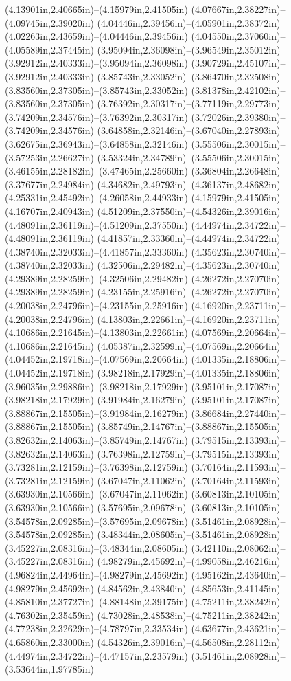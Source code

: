 (4.13901in,2.40665in)--(4.15979in,2.41505in) (4.07667in,2.38227in)--(4.09745in,2.39020in) (4.04446in,2.39456in)--(4.05901in,2.38372in) (4.02263in,2.43659in)--(4.04446in,2.39456in) (4.04550in,2.37060in)--(4.05589in,2.37445in) (3.95094in,2.36098in)--(3.96549in,2.35012in) (3.92912in,2.40333in)--(3.95094in,2.36098in) (3.90729in,2.45107in)--(3.92912in,2.40333in) (3.85743in,2.33052in)--(3.86470in,2.32508in) (3.83560in,2.37305in)--(3.85743in,2.33052in) (3.81378in,2.42102in)--(3.83560in,2.37305in) (3.76392in,2.30317in)--(3.77119in,2.29773in) (3.74209in,2.34576in)--(3.76392in,2.30317in) (3.72026in,2.39380in)--(3.74209in,2.34576in) (3.64858in,2.32146in)--(3.67040in,2.27893in) (3.62675in,2.36943in)--(3.64858in,2.32146in) (3.55506in,2.30015in)--(3.57253in,2.26627in) (3.53324in,2.34789in)--(3.55506in,2.30015in) (3.46155in,2.28182in)--(3.47465in,2.25660in) (3.36804in,2.26648in)--(3.37677in,2.24984in) (4.34682in,2.49793in)--(4.36137in,2.48682in) (4.25331in,2.45492in)--(4.26058in,2.44933in) (4.15979in,2.41505in)--(4.16707in,2.40943in) (4.51209in,2.37550in)--(4.54326in,2.39016in) (4.48091in,2.36119in)--(4.51209in,2.37550in) (4.44974in,2.34722in)--(4.48091in,2.36119in) (4.41857in,2.33360in)--(4.44974in,2.34722in) (4.38740in,2.32033in)--(4.41857in,2.33360in) (4.35623in,2.30740in)--(4.38740in,2.32033in) (4.32506in,2.29482in)--(4.35623in,2.30740in) (4.29389in,2.28259in)--(4.32506in,2.29482in) (4.26272in,2.27070in)--(4.29389in,2.28259in) (4.23155in,2.25916in)--(4.26272in,2.27070in) (4.20038in,2.24796in)--(4.23155in,2.25916in) (4.16920in,2.23711in)--(4.20038in,2.24796in) (4.13803in,2.22661in)--(4.16920in,2.23711in) (4.10686in,2.21645in)--(4.13803in,2.22661in) (4.07569in,2.20664in)--(4.10686in,2.21645in) (4.05387in,2.32599in)--(4.07569in,2.20664in) (4.04452in,2.19718in)--(4.07569in,2.20664in) (4.01335in,2.18806in)--(4.04452in,2.19718in) (3.98218in,2.17929in)--(4.01335in,2.18806in) (3.96035in,2.29886in)--(3.98218in,2.17929in) (3.95101in,2.17087in)--(3.98218in,2.17929in) (3.91984in,2.16279in)--(3.95101in,2.17087in) (3.88867in,2.15505in)--(3.91984in,2.16279in) (3.86684in,2.27440in)--(3.88867in,2.15505in) (3.85749in,2.14767in)--(3.88867in,2.15505in) (3.82632in,2.14063in)--(3.85749in,2.14767in) (3.79515in,2.13393in)--(3.82632in,2.14063in) (3.76398in,2.12759in)--(3.79515in,2.13393in) (3.73281in,2.12159in)--(3.76398in,2.12759in) (3.70164in,2.11593in)--(3.73281in,2.12159in) (3.67047in,2.11062in)--(3.70164in,2.11593in) (3.63930in,2.10566in)--(3.67047in,2.11062in) (3.60813in,2.10105in)--(3.63930in,2.10566in) (3.57695in,2.09678in)--(3.60813in,2.10105in) (3.54578in,2.09285in)--(3.57695in,2.09678in) (3.51461in,2.08928in)--(3.54578in,2.09285in) (3.48344in,2.08605in)--(3.51461in,2.08928in) (3.45227in,2.08316in)--(3.48344in,2.08605in) (3.42110in,2.08062in)--(3.45227in,2.08316in) (4.98279in,2.45692in)--(4.99058in,2.46216in) (4.96824in,2.44964in)--(4.98279in,2.45692in) (4.95162in,2.43640in)--(4.98279in,2.45692in) (4.84562in,2.43840in)--(4.85653in,2.41145in) (4.85810in,2.37727in)--(4.88148in,2.39175in) (4.75211in,2.38242in)--(4.76302in,2.35459in) (4.73028in,2.48538in)--(4.75211in,2.38242in) (4.77238in,2.32629in)--(4.78797in,2.33534in) (4.63677in,2.43621in)--(4.65860in,2.33000in) (4.54326in,2.39016in)--(4.56508in,2.28112in) (4.44974in,2.34722in)--(4.47157in,2.23579in) (3.51461in,2.08928in)--(3.53644in,1.97785in) 